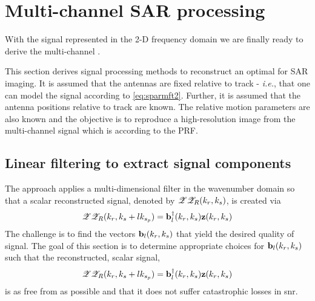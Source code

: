 \section{Multi-channel SAR processing}
\label{sc:hrws}
With the signal represented in the 2-D frequency domain we are finally ready to derive the \gls{multi-channel} .
\par
This section derives signal processing methods to reconstruct an optimal  for  SAR imaging. It is assumed that the antennas are fixed relative to track - {\em i.e.}, that one can model the signal according to \eqref{eq:sparmft2}. Further, it is assumed that the antenna positions relative to track are known. The relative motion parameters are also known and the objective is to reproduce a high-resolution image from the multi-channel signal which is  according to the PRF.
\subsection{Linear filtering to extract signal components}
\label{sc:linearfilt}
The  approach applies a multi-dimensional filter in the wavenumber domain so that a scalar reconstructed signal, denoted by $\mathscr{Z}\mathscr{Z}_{R}(k_r,k_{s})$, is created via 
\begin{equation}
 \mathscr{Z}\mathscr{Z}_{R}(k_r, k_{s} + lk_{s_p}) = \mathbf{b}^\dagger_l(k_r, k_{s})\mathbf{z}(k_r, k_{s})
\end{equation}
The challenge is to find the vectors $\mathbf{b}_l(k_r, k_{s})$ that yield the desired quality of signal. The goal of this section is to determine appropriate choices for $\mathbf{b}_l(k_r, k_{s})$ such that the reconstructed, scalar signal,
\begin{equation}
 \mathscr{Z}\mathscr{Z}_{R}(k_r, k_{s} + lk_{s_p}) = \mathbf{b}^\dagger_l(k_r, k_{s})\mathbf{z}(k_r, k_{s})
\end{equation}
is as free from  as possible and that it does not suffer catastrophic losses in \gls{snr}.
